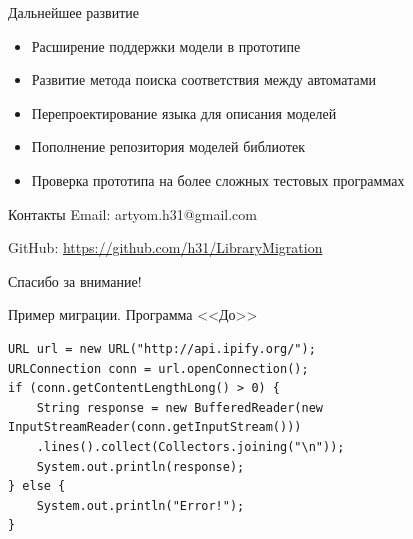 \documentclass[12pt]{beamer}
\begin{document}
{
\begin{frame}{Дальнейшее развитие}
	\begin{mybox}[]
	\begin{itemize}
		\item Расширение поддержки модели в прототипе
		\item Развитие метода поиска соответствия между автоматами
		\item Перепроектирование языка для описания моделей
		\item Пополнение репозитория моделей библиотек
		\item Проверка прототипа на более сложных тестовых программах
	\end{itemize}
	\end{mybox}
\end{frame}
}

\begin{frame}[t]{Контакты}
	Email: artyom.h31@gmail.com
	
	GitHub: \url{https://github.com/h31/LibraryMigration}
	
	\vspace{1cm}
	\begin{center}
		\Large
		Спасибо за внимание!
	\end{center}
\end{frame}

\begin{frame}[fragile]{Пример миграции. Программа <<До>>}

\begin{verbatim}
URL url = new URL("http://api.ipify.org/");
URLConnection conn = url.openConnection();
if (conn.getContentLengthLong() > 0) {
    String response = new BufferedReader(new InputStreamReader(conn.getInputStream()))
    .lines().collect(Collectors.joining("\n"));
    System.out.println(response);
} else {
    System.out.println("Error!");
}
\end{verbatim}
\end{frame}
\end{document}
